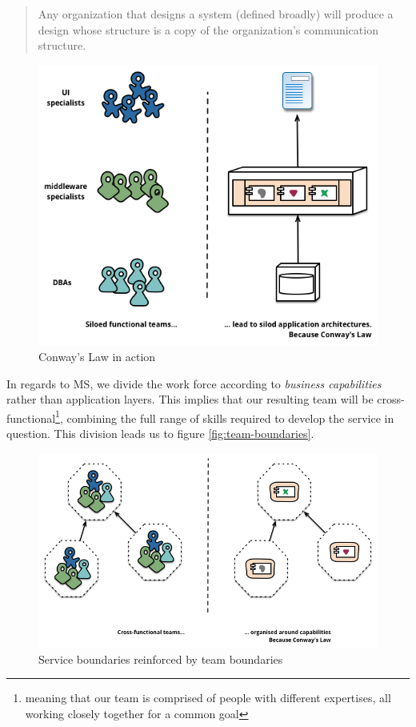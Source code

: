 \begin{quote}
	Any organization that designs a system (defined broadly) will
	produce a design whose structure is a copy of the organization's
	communication structure.  
\end{quote}

\begin{figure}
	\centering
	\includegraphics[width=\linewidth]{images/conways-law.png}
	\caption{Conway's Law in action}
	\label{fig:conway}
\end{figure}

In regards to MS, we divide the work force according to
\textit{business capabilities} rather than application layers. This
implies that our resulting team will be
cross-functional\footnote{meaning that our team is comprised of people
with different expertises, all working closely together for a common
goal}, combining the full range of skills required to develop the
service in question. This division leads us to figure
\vref{fig:team-boundaries}.

\begin{figure}
	\centering
	\includegraphics[width=\linewidth]{images/PreferFunctionalStaffOrganization.png}
	\caption{Service boundaries reinforced by team boundaries}
	\label{fig:team-boundaries}
\end{figure}

